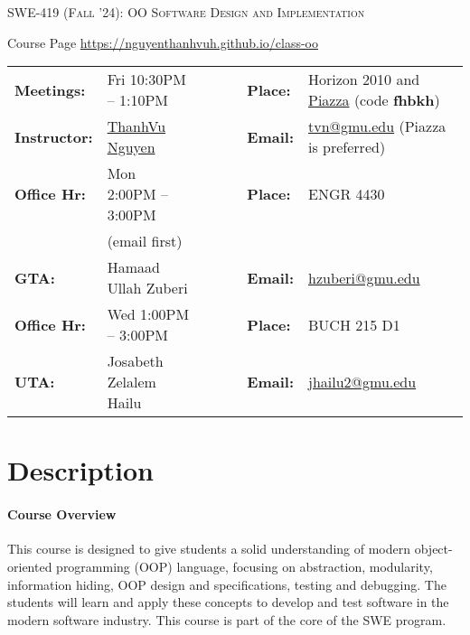 \documentclass[11pt]{article}
\begin{document}
\begin{center}
{\Large \textsc{SWE-419 (Fall '24): OO Software Design and Implementation}}
\end{center}
\begin{center}
Course Page \url{https://nguyenthanhvuh.github.io/class-oo}
\end{center}



\begin{minipage}[t]{.75\textwidth}
    \centering
\begin{tabular}{llcccll}
  \toprule
  \textbf{Meetings:} & Fri 10:30PM -- 1:10PM  & & & & \textbf{Place:} & Horizon 2010 and \href{https://piazza.com/gmu/fall2024/swe419nguyen}{Piazza} (code \textbf{fhbkh})\\
\textbf{Instructor:} & \href{https://go.gmu.edu/tvn}{ThanhVu Nguyen} & & &  & \textbf{Email:} &  \href{mailto:tvn@gmu.edu}{tvn@gmu.edu} (Piazza is preferred)\\
\textbf{Office Hr:} & Mon 2:00PM -- 3:00PM & & & & \textbf{Place:} & ENGR 4430\\
                     &(email first)&&&&&\\
  \hline
\textbf{GTA:} & Hamaad Ullah Zuberi & & &  & \textbf{Email:} &  \href{mailto:hzuberi@gmu.edu}{hzuberi@gmu.edu}\\
\textbf{Office Hr:} & Wed 1:00PM -- 3:00PM & & & & \textbf{Place:} & BUCH 215 D1 \\
  \hline
\textbf{UTA:} & Josabeth Zelalem Hailu & & &  & \textbf{Email:} &  \href{mailto:jhailu2@gmu.edu}{jhailu2@gmu.edu}\\
\bottomrule
\end{tabular}
\end{minipage}
 

\section{Description}

\paragraph{Course Overview}
This course is designed to give students a solid understanding of modern object-oriented programming (OOP) language, focusing on abstraction, modularity, information hiding, OOP design and specifications, testing and debugging. The students will learn and apply these concepts to develop and test software in the modern software industry.  This course is part of the core of the SWE program.
\end{document}
